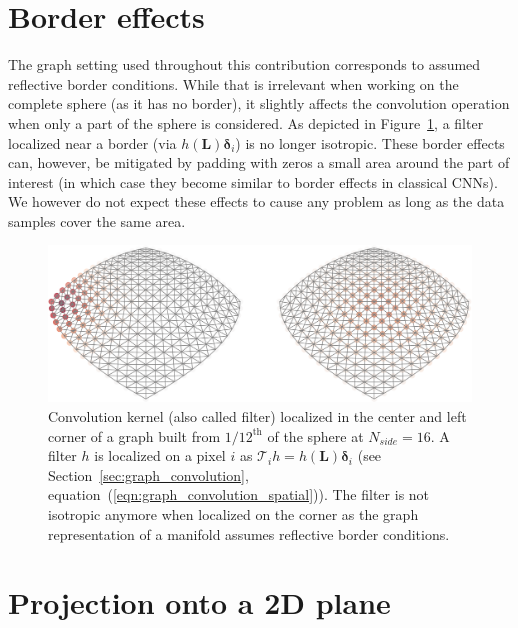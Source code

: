 \documentclass[final,twocolumn,3p,times,sort&compress]{elsarticle}
\newcommand{\figref}[1]{Figure~\ref{fig:#1}}
\newcommand{\secref}[1]{Section~\ref{sec:#1}}
\newcommand{\eqnref}[1]{(\ref{eqn:#1})}
\renewcommand{\b}[1]{{\bm{#1}}}   %
\newcommand{\1}{\b{1}}              %
\newcommand{\0}{\b{0}}              %
\renewcommand{\L}{\b{L}}
\newcommand{\T}{\mathcal{T}}
\begin{document}
\section{Border effects}
\label{sec:border_effects}

The graph setting used throughout this contribution corresponds to assumed reflective border conditions.
While that is irrelevant when working on the complete sphere (as it has no border), it slightly affects the convolution operation when only a part of the sphere is considered.
As depicted in \figref{border_effects}, a filter localized near a border (via $h(\L) \b \delta_i$) is no longer isotropic.
These border effects can, however, be mitigated by padding with zeros a small area around the part of interest (in which case they become similar to border effects in classical CNNs).
We however do not expect these effects to cause any problem as long as the data samples cover the same area.

\begin{figure}[ht!]
	\centering
	\includegraphics[width=\linewidth]{border_effects}
	\caption{Convolution kernel (also called filter) localized in the center and left corner of a graph built from $1/12^\text{th}$ of the sphere at $N_{side} = 16$.
		A filter $h$ is localized on a pixel $i$ as $\T_i h = h(\L) \b \delta_i$ (see \secref{graph_convolution}, equation~\eqnref{graph_convolution_spatial}).
	The filter is not isotropic anymore when localized on the corner as the graph representation of a manifold assumes reflective border conditions.}
	\label{fig:border_effects}
\end{figure}

\section{Projection onto a 2D plane}
\label{sec:projection}
\end{document}
